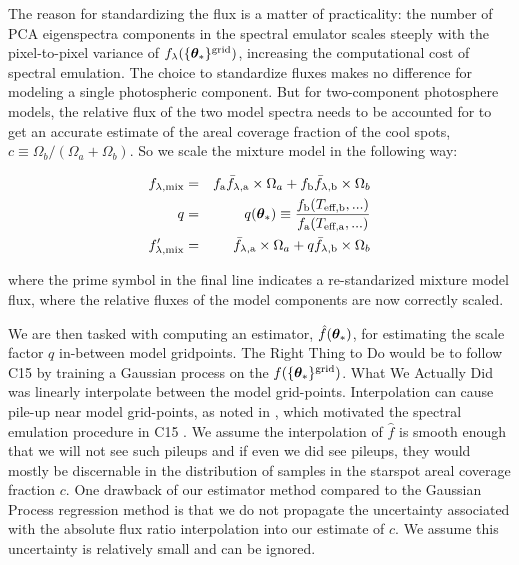 \documentclass[onecolumn]{emulateapj}%
\newcommand{\iancze}{{\sc C15 }}
\begin{document}
The reason for standardizing the flux is a matter of practicality: the number of PCA eigenspectra components in the spectral emulator scales steeply with the pixel-to-pixel variance of $f_{\lambda}(\{{\bm \theta}_{\ast}\}^\textrm{grid})$, increasing the computational cost of spectral emulation.  The choice to standardize fluxes makes no difference for modeling a single photospheric component.  But for two-component photosphere models, the relative flux of the two model spectra needs to be accounted for to get an accurate estimate of the areal coverage fraction of the cool spots, $c \equiv \Omega_b/(\Omega_a+\Omega_b)$.  So we scale the mixture model in the following way:

\begin{eqnarray} \label{eqn:norm_scaling}
f_{\lambda, \mathrm{mix}} &=& f_{\mathrm{a}} \bar f_{\lambda, \mathrm{a}} \times \Omega_a + f_{\mathrm{b}} \bar f_{\lambda, \mathrm{b}} \times \Omega_b \\
q &=& q({\bm \theta}_{\ast})\equiv \frac{f_{\mathrm{b}}(T_\textrm{eff,b}, ...)}{f_{\mathrm{a}}(T_\textrm{eff,a}, ...)} \\
f_{\lambda, \mathrm{mix}}^{\prime} &=& \bar f_{\lambda, \mathrm{a}} \times \Omega_a + q \bar f_{\lambda, \mathrm{b}} \times \Omega_b
\end{eqnarray}

where the prime symbol in the final line indicates a re-standarized mixture model flux, where the relative fluxes of the model components are now correctly scaled.

We are then tasked with computing an estimator, $\hat f({\bm \theta}_{\ast})$, for estimating the scale factor $q$ in-between model gridpoints.  The Right Thing to Do would be to follow \iancze by training a Gaussian process on the $f(\{{\bm \theta}_{\ast}\}^\textrm{grid})$.  What We Actually Did was linearly interpolate between the model grid-points.  Interpolation can cause pile-up near model grid-points, as noted in \citet{2014ApJ...794..125C}, which motivated the spectral emulation procedure in \iancze.  We assume the interpolation of $\hat f$ is smooth enough that we will not see such pileups and if even we did see pileups, they would mostly be discernable in the distribution of samples in the starspot areal coverage fraction $c$.  One drawback of our estimator method compared to the Gaussian Process regression method is that we do not propagate the uncertainty associated with the absolute flux ratio interpolation into our estimate of $c$.  We assume this uncertainty is relatively small and can be ignored.
\end{document}

